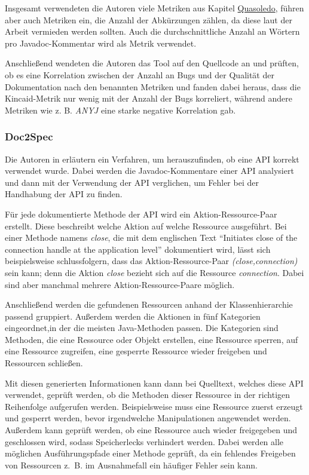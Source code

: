 Insgesamt verwendeten die Autoren viele Metriken aus Kapitel \hyperref[chapter:Quasoledo]{Quasoledo}, führen aber auch Metriken ein, die Anzahl der Abkürzungen zählen, da diese laut der Arbeit vermieden werden sollten. Auch die durchschnittliche Anzahl an Wörtern pro Javadoc-Kommentar wird als Metrik verwendet. 

Anschließend wendeten die Autoren das Tool auf den Quellcode an und prüften, ob es eine Korrelation zwischen der Anzahl an Bugs und der Qualität der Dokumentation nach den benannten Metriken und fanden dabei heraus, dass die Kincaid-Metrik nur wenig mit der Anzahl der Bugs korreliert, während andere Metriken wie z. B. \textit{ANYJ} eine starke negative Korrelation gab. 

\subsubsection{Doc2Spec}
Die Autoren in \cite[S. 307ff.]{InferringResourceSpecificationsfromNaturalLanguageAPIDocumentation} erläutern ein Verfahren, um herauszufinden, ob eine API korrekt verwendet wurde. Dabei werden die Javadoc-Kommentare einer API analysiert und dann mit der Verwendung der API verglichen, um Fehler bei der Handhabung der API zu finden. 

Für jede dokumentierte Methode der API wird ein Aktion-Ressource-Paar erstellt. Diese beschreibt welche Aktion auf welche Ressource ausgeführt. Bei einer Methode namens \textit{close}, die mit dem englischen Text \enquote{Initiates close of the connection handle at the
application level} dokumentiert wird, lässt sich beispielsweise schlussfolgern, dass das Aktion-Ressource-Paar \textit{(close,connection)} sein kann; denn die Aktion \textit{close} bezieht sich auf die Ressource \textit{connection}. Dabei sind aber manchmal mehrere Aktion-Ressource-Paare möglich\cite[S. 308]{InferringResourceSpecificationsfromNaturalLanguageAPIDocumentation}.

Anschließend werden die gefundenen Ressourcen anhand der Klassenhierarchie passend gruppiert. Außerdem werden die Aktionen in fünf Kategorien eingeordnet,in der die meisten Java-Methoden passen. Die Kategorien sind Methoden, die eine Ressource oder Objekt erstellen, eine Ressource sperren, auf eine Ressource zugreifen, eine gesperrte Ressource wieder freigeben und Ressourcen schließen. 

Mit diesen generierten Informationen kann dann bei Quelltext, welches diese API verwendet, geprüft werden, ob die Methoden dieser Ressource in der richtigen Reihenfolge aufgerufen werden. Beispielsweise muss eine Ressource zuerst erzeugt und gesperrt werden, bevor irgendwelche Manipulationen angewendet werden. Außerdem kann geprüft werden, ob eine Ressource auch wieder freigegeben und geschlossen wird, sodass Speicherlecks verhindert werden. Dabei werden alle möglichen Ausführungspfade einer Methode geprüft, da ein fehlendes Freigeben von Ressourcen z.~B. im Ausnahmefall ein häufiger Fehler sein kann. 

